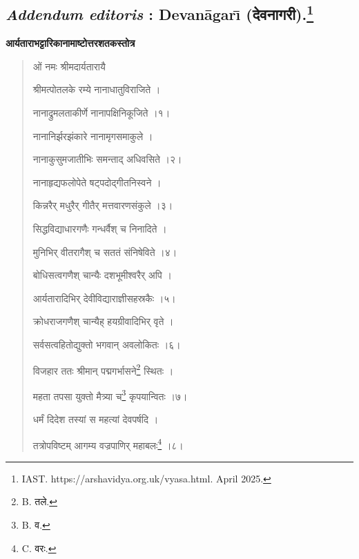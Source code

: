 \documentclass[a4paper, 11pt, oneside, french, landscape, twocolumn]{article}
\begin{document}
\subsection[\emph{Addendum editoris} : Devan\={a}gar\={\i} \texthindi{(देवनागरी)}.]{\emph{Addendum editoris} : Devan\={a}gar\={\i} \texthindi{(देवनागरी)}.\footnote{IAST. https://arshavidya.org.uk/vyasa.html. April 2025.}}
\begin{center}
\textbf{\texthindi{आर्यताराभट्टारिकानामाष्टोत्तरशतकस्तोत्र}}
\end{center}
\begin{quotation}\footnotesize
\texthindi{ओं नमः श्रीमदार्यतारायै}

\bigskip

\texthindi{श्रीमत्पोतलके रम्ये नानाधातुविराजिते ।}

\texthindi{नानाद्रुमलताकीर्णे नानापक्षिनिकूजिते ।१।}

\bigskip

\texthindi{नानानिर्झरझंकारे नानामृगसमाकुले ।}

\texthindi{नानाकुसुमजातीभिः समन्ताद् अधिवसिते ।२।}

\bigskip

\texthindi{नानाहृद्यफलोपेते षट्पदोद्गीतनिस्वने ।}

\texthindi{किन्नरैर् मधुरैर् गीतैर् मत्तवारणसंकुले ।३।}

\bigskip

\texthindi{सिद्धविद्याधारगणैः गन्धर्वैश् च निनादिते ।}

\texthindi{मुनिभिर् वीतरागैश् च सततं संनिषेविते ।४।}

\bigskip

\texthindi{बोधिसत्वगणैश् चान्यैः दशभूमीश्वरैर् अपि ।}

\texthindi{आर्यतारादिभिर् देवीविद्याराज्ञीसहस्रकैः ।५।}

\bigskip

\texthindi{क्रोधराजगणैश् चान्यैह् हयग्रीवादिभिर् वृते ।}

\texthindi{सर्वसत्वहितोद्युक्तो भगवान् अवलोकितः ।६।}

\bigskip

\texthindi{विजहार ततः श्रीमान् पद्मगर्भासने}\footnote{B. \texthindi{तले}.} \texthindi{स्थितः ।}

\texthindi{महता तपसा युक्तो मैत्र्या च}\footnote{B. \texthindi{व}.} \texthindi{कृपयान्वितः ।७।}

\bigskip

\texthindi{धर्मं दिदेश तस्यां स महत्यां देवपर्षदि ।}

\texthindi{तत्रोपविष्टम् आगम्य वज्रपाणिर् महाबलः}\footnote{C. \texthindi{वरः}.} \texthindi{।८।}


\end{quotation}
\end{document}
